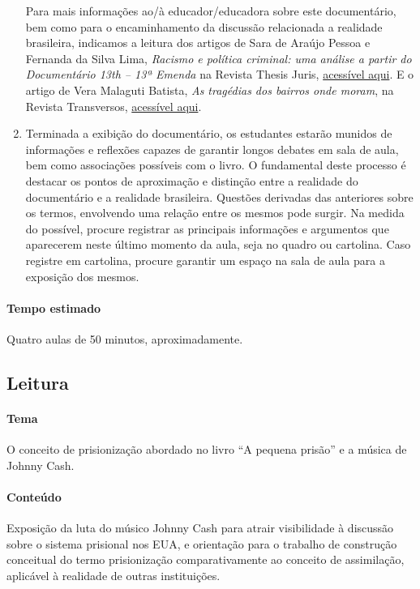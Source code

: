 \documentclass[11pt]{extarticle}
\begin{document}
\begin{enumerate}
Para mais informações ao/à educador/educadora sobre este documentário, bem
como para o encaminhamento da discussão relacionada a realidade
brasileira, indicamos a leitura dos artigos de Sara de Araújo Pessoa e 
Fernanda da Silva Lima, \emph{Racismo e política criminal: uma análise a
partir do Documentário 13th -- 13ª Emenda} na Revista Thesis Juris, 
\href{https://doi.org/10.5585/rtj.v8i2.10763}{acessível aqui}. E o artigo de Vera Malaguti Batista, \emph{As tragédias dos bairros onde
moram}, na Revista Transversos, \href{https://www.e-publicacoes.uerj.br/index.php/transversos/article/view/33656}{acessível aqui}.

\item Terminada a exibição do documentário, os estudantes estarão munidos de
informações e reflexões capazes de garantir longos debates em sala de
aula, bem como associações possíveis com o livro. O fundamental deste
processo é destacar os pontos de aproximação e distinção entre a
realidade do documentário e a realidade brasileira. Questões derivadas
das anteriores sobre os termos, envolvendo uma relação entre os mesmos
pode surgir. Na medida do possível, procure registrar as principais
informações e argumentos que aparecerem neste último momento da aula,
seja no quadro ou cartolina. Caso registre em cartolina, procure
garantir um espaço na sala de aula para a exposição dos mesmos.
\end{enumerate}


\paragraph{Tempo estimado} Quatro aulas de 50 minutos, aproximadamente.

\subsection{Leitura}

\paragraph{Tema} O conceito de prisionização abordado no livro ``A pequena
prisão'' e a música de Johnny Cash.

\paragraph{Conteúdo} Exposição da luta do músico Johnny Cash para atrair
visibilidade à discussão sobre o sistema prisional nos EUA, e orientação
para o trabalho de construção conceitual do termo prisionização
comparativamente ao conceito de assimilação, aplicável à realidade de
outras instituições.
\end{document}
